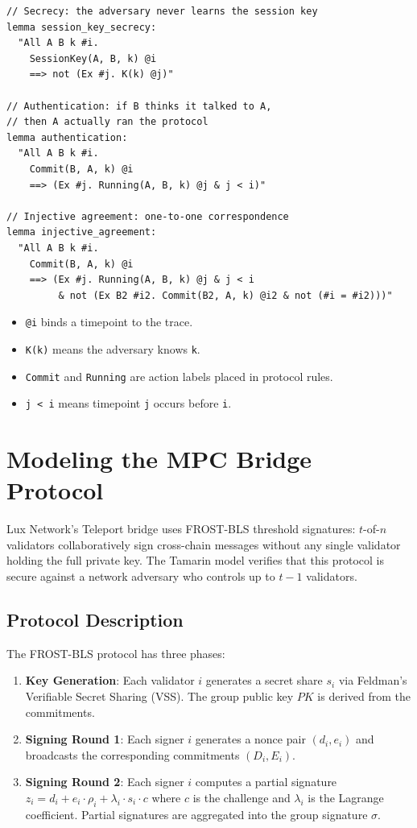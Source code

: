 \documentclass[11pt,a4paper]{article}
\begin{document}
\begin{lstlisting}[language=Tamarin,caption={Security property specification}]
// Secrecy: the adversary never learns the session key
lemma session_key_secrecy:
  "All A B k #i.
    SessionKey(A, B, k) @i
    ==> not (Ex #j. K(k) @j)"

// Authentication: if B thinks it talked to A,
// then A actually ran the protocol
lemma authentication:
  "All A B k #i.
    Commit(B, A, k) @i
    ==> (Ex #j. Running(A, B, k) @j & j < i)"

// Injective agreement: one-to-one correspondence
lemma injective_agreement:
  "All A B k #i.
    Commit(B, A, k) @i
    ==> (Ex #j. Running(A, B, k) @j & j < i
         & not (Ex B2 #i2. Commit(B2, A, k) @i2 & not (#i = #i2)))"
\end{lstlisting}

\begin{itemize}[nosep]
  \item \texttt{@i} binds a timepoint to the trace.
  \item \texttt{K(k)} means the adversary knows \texttt{k}.
  \item \texttt{Commit} and \texttt{Running} are action labels placed in protocol rules.
  \item \texttt{j < i} means timepoint \texttt{j} occurs before \texttt{i}.
\end{itemize}

\section{Modeling the MPC Bridge Protocol}

Lux Network's Teleport bridge uses FROST-BLS threshold signatures: $t$-of-$n$ validators
collaboratively sign cross-chain messages without any single validator holding the full
private key. The Tamarin model verifies that this protocol is secure against a network
adversary who controls up to $t - 1$ validators.

\subsection{Protocol Description}

The FROST-BLS protocol has three phases:
\begin{enumerate}
  \item \textbf{Key Generation}: Each validator $i$ generates a secret share $s_i$ via
    Feldman's Verifiable Secret Sharing (VSS). The group public key $PK$ is derived from
    the commitments.
  \item \textbf{Signing Round 1}: Each signer $i$ generates a nonce pair $(d_i, e_i)$
    and broadcasts the corresponding commitments $(D_i, E_i)$.
  \item \textbf{Signing Round 2}: Each signer $i$ computes a partial signature
    $z_i = d_i + e_i \cdot \rho_i + \lambda_i \cdot s_i \cdot c$ where $c$ is the
    challenge and $\lambda_i$ is the Lagrange coefficient. Partial signatures are
    aggregated into the group signature $\sigma$.
\end{enumerate}
\end{document}
